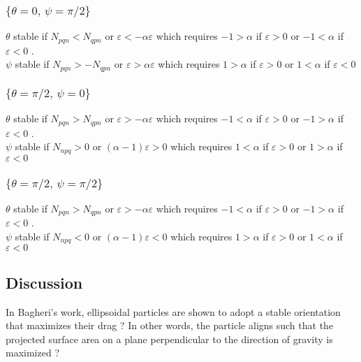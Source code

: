 \documentclass[12pt]{My_preprint}
\begin{document}
\subsubsection{$\{\theta = 0, \, \psi = \pi/2\}$}
$\theta$ stable if $N_{pqn} < N_{qpn}$ or $\varepsilon < -\alpha \varepsilon$ which requires  $-1>\alpha$ if  $\varepsilon > 0$ or $-1 < \alpha$ if $\varepsilon < 0$ .\\
$\psi$ stable if $N_{pqn} > -N_{qpn}$ or $\varepsilon > \alpha \varepsilon$ which requires  $1>\alpha$ if  $\varepsilon > 0$ or $1 < \alpha$ if $\varepsilon < 0$

\subsubsection{$\{\theta = \pi/2, \, \psi = 0\}$}
$\theta$ stable if $N_{pqn} > N_{qpn}$ or $\varepsilon > -\alpha \varepsilon$ which requires  $-1<\alpha$ if  $\varepsilon > 0$ or $-1 > \alpha$ if $\varepsilon < 0$ .\\
$\psi$ stable if $N_{npq}>0$ or $(\alpha - 1)\varepsilon > 0$ which requires  $1 <\alpha$ if  $\varepsilon > 0$ or $1 > \alpha$ if $\varepsilon < 0$

\subsubsection{$\{\theta = \pi/2, \, \psi = \pi/2\}$}
$\theta$ stable if $N_{pqn} > N_{qpn}$ or $\varepsilon > -\alpha \varepsilon$ which requires  $-1<\alpha$ if  $\varepsilon > 0$ or $-1 > \alpha$ if $\varepsilon < 0$ .\\
$\psi$ stable if $N_{npq}<0$ or $(\alpha - 1)\varepsilon < 0$ which requires  $1 >\alpha$ if  $\varepsilon > 0$ or $1 < \alpha$ if $\varepsilon < 0$

\subsection{Discussion}
In Bagheri's work, ellipsoidal particles are shown to adopt a stable orientation that maximizes their drag ?
In other words, the particle aligns such that the projected surface area on a plane perpendicular to the direction of gravity is maximized ?
\end{document}
